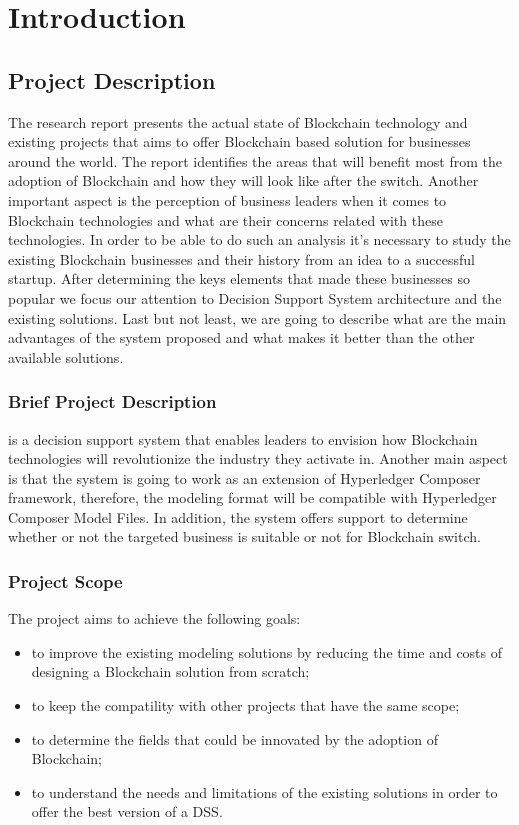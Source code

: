 \chapter{Introduction}
\label{chapter:intro}

\section{Project Description}
\label{sec:intro-section1}
The research report presents the actual state of Blockchain technology and existing projects that aims to offer Blockchain based solution for businesses around the world. 
The report identifies the areas that will benefit most from the adoption of Blockchain and how they will look like after the switch. Another important aspect is the perception of business leaders when it comes to Blockchain technologies and what are their concerns related with these technologies.
In order to be able to do such an analysis it’s necessary to study the existing Blockchain businesses and their history from an idea to a successful startup. After determining the keys elements that made these businesses so popular we focus our attention to Decision Support System architecture and the existing solutions. Last but not least, we are going to describe what are the main advantages of the system proposed and what makes it better than the other available solutions.

\subsection{Brief Project Description}
\label{sub-sec:intro-subsection1}
\textbf{\project} is a decision support system that enables leaders to envision how Blockchain technologies will revolutionize the industry they activate in.
Another main aspect is that the system is going to work as an extension of Hyperledger Composer framework, therefore, the modeling format will be compatible with Hyperledger Composer Model Files.
In addition, the system offers support to determine whether or not the targeted business is suitable or not for Blockchain switch.


\subsection{Project Scope}
\label{sub-sec:intro-subsection2}
The project aims to achieve the following goals:
\begin{itemize}
	\item to improve the existing modeling solutions by reducing the time and costs of designing a Blockchain solution from scratch;
	\item to keep the compatility with other projects that have the same scope;
	\item to determine the fields that could be innovated by the adoption of Blockchain;
	\item to understand the needs and limitations of the existing solutions in order to offer the best version of a DSS.
\end{itemize}  

